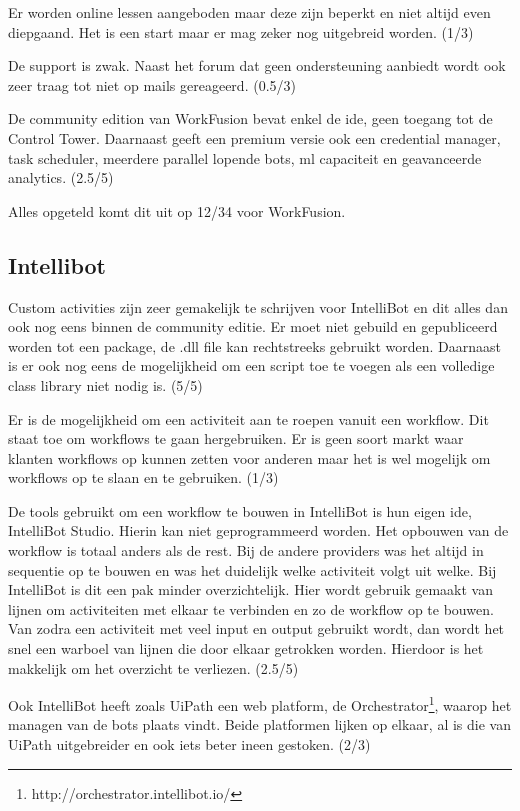 Er worden online lessen aangeboden maar deze zijn beperkt en niet altijd even diepgaand. Het is een start maar er mag zeker nog uitgebreid worden. (1/3)

De support is zwak. Naast het forum dat geen ondersteuning aanbiedt wordt ook zeer traag tot niet op mails gereageerd. (0.5/3)

De community edition van WorkFusion bevat enkel de \acrshort{ide}, geen toegang tot de Control Tower. Daarnaast geeft een premium versie ook een credential manager, task scheduler, meerdere parallel lopende bots, \acrshort{ml} capaciteit en geavanceerde analytics. (2.5/5)

Alles opgeteld komt dit uit op 12/34 voor WorkFusion.

\subsection{Intellibot}

Custom activities zijn zeer gemakelijk te schrijven voor IntelliBot en dit alles dan ook nog eens binnen de community editie. Er moet niet gebuild en gepubliceerd worden tot een package, de .dll file kan rechtstreeks gebruikt worden. Daarnaast is er ook nog eens de mogelijkheid om een script toe te voegen als een volledige class library niet nodig is. (5/5)

Er is de mogelijkheid om een \gls{activiteit} aan te roepen vanuit een \gls{workflow}. Dit staat toe om \gls{workflow}s te gaan hergebruiken. Er is geen soort markt waar klanten \gls{workflow}s op kunnen zetten voor anderen maar het is wel mogelijk om \gls{workflow}s op te slaan en te gebruiken. (1/3)

De tools gebruikt om een \gls{workflow} te bouwen in IntelliBot is hun eigen \acrshort{ide}, IntelliBot Studio. Hierin kan niet geprogrammeerd worden. Het opbouwen van de \gls{workflow} is totaal anders als de rest. Bij de andere providers was het altijd in sequentie op te bouwen en was het duidelijk welke \gls{activiteit} volgt uit welke. Bij IntelliBot is dit een pak minder overzichtelijk. Hier wordt gebruik gemaakt van lijnen om \gls{activiteit}en met elkaar te verbinden en zo de \gls{workflow} op te bouwen. Van zodra een \gls{activiteit} met veel input en output gebruikt wordt, dan wordt het snel een warboel van lijnen die door elkaar getrokken worden. Hierdoor is het makkelijk om het overzicht te verliezen. (2.5/5)

Ook IntelliBot heeft zoals UiPath een web platform, de Orchestrator\footnote{http://orchestrator.intellibot.io/}, waarop het managen van de bots plaats vindt. Beide platformen lijken op elkaar, al is die van UiPath uitgebreider en ook iets beter ineen gestoken. (2/3)

